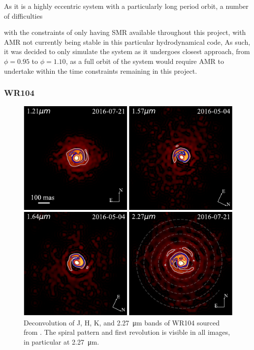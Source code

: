 
As it is a highly eccentric system with a particularly long period orbit, a number of difficulties 

with the constraints of only having SMR available throughout this project, with AMR not currently being stable in this particular hydrodynamical code, 
As such, it was decided to only simulate the system as it undergoes closest approach, from $\phi = 0.95$ to $\phi = 1.10$, as a full orbit of the system would require AMR to undertake within the time constraints remaining in this project. 


\subsubsection{WR104}

\begin{figure}
  \centering
  \includegraphics[]{assets/systems/soulain-2018-wr104.pdf}
  \caption[\textit{Spiral structure of WR104 \parencite{soulainSPHEREViewWolfRayet2018}}]{Deconvolution of J, H, K, and \SI{2.27}{\micro\metre} bands of WR104 sourced from \textcite{soulainSPHEREViewWolfRayet2018}. The spiral pattern and first revolution is visible in all images, in particular at \SI{2.27}{\micro\metre}.}
  \label{fig:soulain-wr104}
\end{figure}

